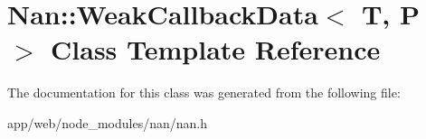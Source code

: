 \hypertarget{class_nan_1_1_weak_callback_data}{}\section{Nan\+:\+:Weak\+Callback\+Data$<$ T, P $>$ Class Template Reference}
\label{class_nan_1_1_weak_callback_data}


The documentation for this class was generated from the following file\+:\begin{DoxyCompactItemize}
\item 
app/web/node\+\_\+modules/nan/nan.\+h\end{DoxyCompactItemize}
